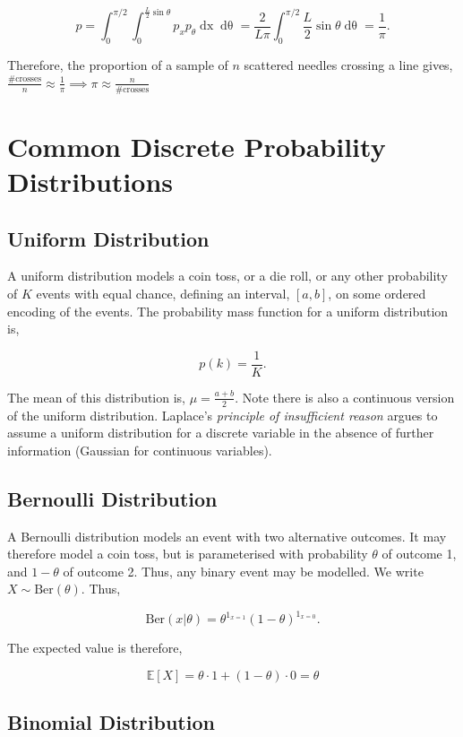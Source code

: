 \documentclass[11pt]{amsart}
\begin{document}
$$
p = \int_{0}^{\pi/2}\int_{0}^{\frac{L}{2}\sin\theta}p_xp_{\theta}\mathop{dx}\mathop{d\theta} = \frac{2}{L\pi}\int_{0}^{\pi/2}\frac{L}{2}\sin\theta\mathop{d\theta} = \frac{1}{\pi}.
$$

Therefore, the proportion of a sample of $n$ scattered needles crossing a line gives, $\frac{\text{\# crosses}}{n} \approx \frac{1}{\pi} \implies \pi \approx \frac{n}{\text{\# crosses}}$

\section{Common Discrete Probability Distributions}

\subsection{Uniform Distribution}

A uniform distribution models a coin toss, or a die roll, or any other probability of $K$ events with equal chance, defining an interval, $[a, b]$, on some ordered encoding of the events. The probability mass function for a uniform distribution is,

$$p(k) = \frac{1}{K}.$$

The mean of this distribution is, $\mu = \frac{a + b}{2}$. Note there is also a continuous version of the uniform distribution. Laplace's \emph{principle of insufficient reason} argues to assume a uniform distribution for a discrete variable in the absence of further information (Gaussian for continuous variables).

\subsection{Bernoulli Distribution}

A Bernoulli distribution models an event with two alternative outcomes. It may therefore model a coin toss, but is parameterised with probability $\theta$ of outcome 1, and $1 - \theta$ of outcome 2. Thus, any binary event may be modelled. We write $X \sim \text{Ber}(\theta)$. Thus,

$$\text{Ber}(x|\theta) = \theta^{1_{x=1}}(1 - \theta)^{1_{x=0}}.$$

The expected value is therefore,

$$\mathbb{E}[X] = \theta \cdot 1 + (1 - \theta) \cdot 0 = \theta$$

\subsection{Binomial Distribution}
\end{document}
